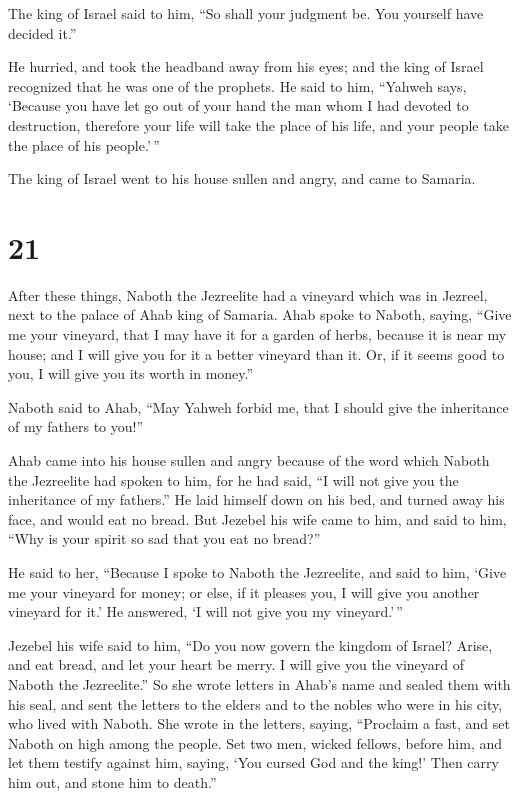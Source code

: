The king of Israel said to him, ``So shall your judgment be. You
yourself have decided it.''

 He hurried, and took the headband away from his eyes;
and the king of Israel recognized that he was one of the prophets.
 He said to him, ``Yahweh says, `Because you have let go
out of your hand the man whom I had devoted to destruction, therefore
your life will take the place of his life, and your people take the
place of his people.'\,''

 The king of Israel went to his house sullen and angry,
and came to Samaria.

\hypertarget{section-20}{%
\section{21}\label{section-20}}

 After these things, Naboth the Jezreelite had a vineyard
which was in Jezreel, next to the palace of Ahab king of Samaria.
 Ahab spoke to Naboth, saying, ``Give me your vineyard,
that I may have it for a garden of herbs, because it is near my house;
and I will give you for it a better vineyard than it. Or, if it seems
good to you, I will give you its worth in money.''

 Naboth said to Ahab, ``May Yahweh forbid me, that I
should give the inheritance of my fathers to you!''

 Ahab came into his house sullen and angry because of the
word which Naboth the Jezreelite had spoken to him, for he had said, ``I
will not give you the inheritance of my fathers.'' He laid himself down
on his bed, and turned away his face, and would eat no bread.
 But Jezebel his wife came to him, and said to him, ``Why
is your spirit so sad that you eat no bread?''

 He said to her, ``Because I spoke to Naboth the
Jezreelite, and said to him, `Give me your vineyard for money; or else,
if it pleases you, I will give you another vineyard for it.' He
answered, `I will not give you my vineyard.'\,''

 Jezebel his wife said to him, ``Do you now govern the
kingdom of Israel? Arise, and eat bread, and let your heart be merry. I
will give you the vineyard of Naboth the Jezreelite.''  So
she wrote letters in Ahab's name and sealed them with his seal, and sent
the letters to the elders and to the nobles who were in his city, who
lived with Naboth.  She wrote in the letters, saying,
``Proclaim a fast, and set Naboth on high among the people.
 Set two men, wicked fellows, before him, and let them
testify against him, saying, `You cursed God and the king!' Then carry
him out, and stone him to death.''

